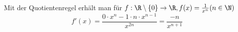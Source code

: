 Mit der Quotientenregel erhält man für $f: \R \setminus \{0\} \to \R, f(x) = \frac{1}{x^n} (n \in \N)$
$$f'(x) = \frac{0 \cdot x^n - 1 \cdot n \cdot x^{n-1}}{x^{2n}} = \frac{-n}{x^{n+1}}$$